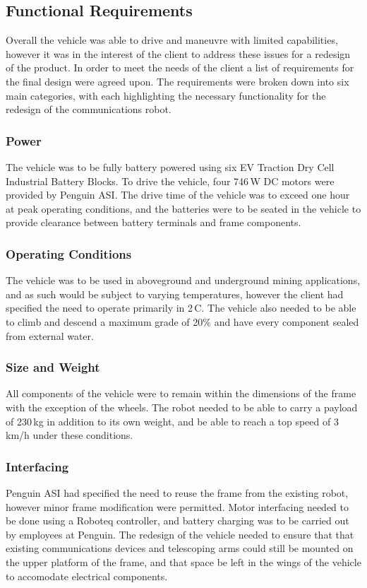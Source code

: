 \subsection{Functional Requirements}
Overall the vehicle was able to drive and maneuvre with limited capabilities, however it was in the interest of the client to address these issues for a redesign of the product. In order to meet the needs of the client a list of requirements for the final design were agreed upon. The requirements were broken down into six main categories, with each highlighting the necessary functionality for the redesign of the communications robot. 
\subsubsection{Power}
The vehicle was to be fully battery powered using six EV Traction Dry Cell Industrial Battery Blocks. To drive the vehicle, four 746\,W DC motors were provided by Penguin ASI. The drive time of the vehicle was to exceed one hour at peak operating conditions, and the batteries were to be seated in the vehicle to provide clearance between battery terminals and frame components.
\subsubsection{Operating Conditions}
The vehicle was to be used in aboveground and underground mining applications, and as such would be subject to varying temperatures, however the client had specified the need to operate primarily in 2\,\degree C. The vehicle also needed to be able to climb and descend a maximum grade of 20\% and have every component sealed from external water.
\subsubsection{Size and Weight}
All components of the vehicle were to remain within the dimensions of the frame with the exception of the wheels. The robot needed to be able to carry a payload of 230\,kg in addition to its own weight, and be able to reach a top speed of 3\,km/h under these conditions.
\subsubsection{Interfacing}
Penguin ASI had specified the need to reuse the frame from the existing robot, however minor frame modification were permitted. Motor interfacing needed to be done using a Roboteq controller, and battery charging was to be carried out by employees at Penguin. The redesign of the vehicle needed to ensure that that existing communications devices and telescoping arms could still be mounted on the upper platform of the frame, and that space be left in the wings of the vehicle to accomodate electrical components.
